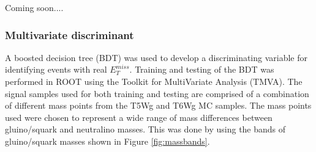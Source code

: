 Coming soon....
\subsubsection{Multivariate discriminant}
A boosted decision tree (BDT) was used to develop a discriminating variable for identifying events with real $E^{miss}_T$.  Training and testing of the BDT was performed in ROOT using the Toolkit for MultiVariate Analysis (TMVA).  The signal samples used for both training and testing are comprised of a combination of different mass points from the T5Wg and T6Wg MC samples.  The mass points used were chosen to represent a wide range of mass differences between gluino/squark and neutralino masses.  This was done by using the bands of gluino/squark masses shown in Figure \ref{fig:massbands}.   
\begin{figure}[h]
	\centering
	\qquad
\end{figure}
